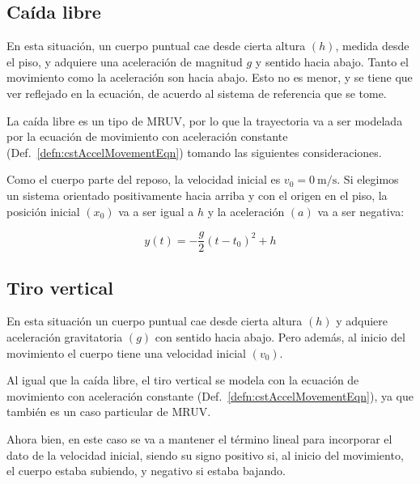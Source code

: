 \subsection{Caída libre}

En esta situación, un cuerpo puntual cae desde cierta altura $(h)$, medida desde el piso, y adquiere una aceleración de magnitud $g$ y sentido hacia abajo.
Tanto el movimiento como la aceleración son hacia abajo.
Esto no es menor, y se tiene que ver reflejado en la ecuación, de acuerdo al sistema de referencia que se tome.

La caída libre es un tipo de MRUV, por lo que la trayectoria va a ser modelada por la ecuación de movimiento con aceleración constante (Def.\ \ref{defn:cstAccelMovementEqn}) tomando las siguientes consideraciones.

Como el cuerpo parte del reposo, la velocidad inicial es $v_0 = \SI{0}{\metre/\second}$.
Si elegimos un sistema orientado positivamente hacia arriba y con el origen en el piso, la posición inicial $\left( x_0 \right)$ va a ser igual a $h$ y la aceleración $(a)$ va a ser negativa:

\begin{mdframed}[style=DefinitionFrame]
    \begin{defn}
    \end{defn}
    \begin{equation*}
        y(t) = -\frac{g}{2} \left(t-t_0\right)^2 + h
    \end{equation*}
\end{mdframed}


\subsection{Tiro vertical}

En esta situación un cuerpo puntual cae desde cierta altura $(h)$ y adquiere aceleración gravitatoria $(g)$ con sentido hacia abajo.
Pero además, al inicio del movimiento el cuerpo tiene una velocidad inicial $(v_0)$.

Al igual que la caída libre, el tiro vertical se modela con la ecuación de movimiento con aceleración constante (Def.\ \ref{defn:cstAccelMovementEqn}), ya que también es un caso particular de MRUV.

Ahora bien, en este caso se va a mantener el término lineal para incorporar el dato de la velocidad inicial, siendo su signo positivo si, al inicio del movimiento, el cuerpo estaba subiendo, y negativo si estaba bajando.

